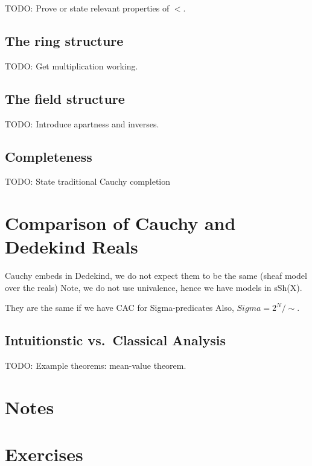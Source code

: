 TODO: Prove or state relevant properties of $<$.

\subsection{The ring structure}
\label{sec:ring-structure}

TODO: Get multiplication working.

\subsection{The field structure}
\label{sec:field-structure}

TODO: Introduce apartness and inverses.

\subsection{Completeness}
\label{sec:completeness-RC}

TODO: State traditional Cauchy completion



\section{Comparison of Cauchy and Dedekind Reals}
\label{sec:comp-cacuhy-dedek}

Cauchy embeds in Dedekind, we do not expect them to be the same (sheaf model over the
reals) Note, we do not use univalence, hence we have models in sSh(X).

They are the same if we have CAC for Sigma-predicates
Also, $Sigma = 2^N/\sim$.


\subsection{Intuitionstic vs.\ Classical Analysis}
\label{sec:intuitionistic-vs-classical-analysis}

TODO: Example theorems: mean-value theorem.


\section*{Notes}
\label{sec:reals-notes}

\section*{Exercises}
\label{sec:reals-exercises}

